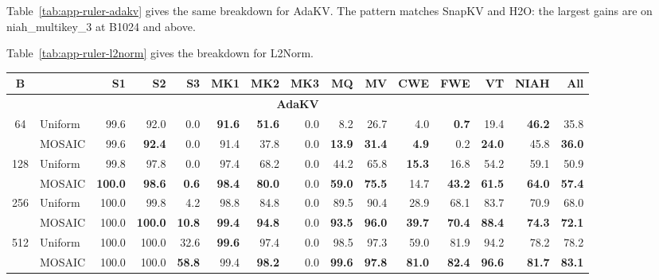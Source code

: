 Table~\ref{tab:app-ruler-adakv} gives the same breakdown for AdaKV. The pattern matches SnapKV and H2O: the largest gains are on niah\_multikey\_3 at B1024 and above.


Table~\ref{tab:app-ruler-l2norm} gives the breakdown for L2Norm.

\begin{table}[tp]
  \centering
  \scriptsize
  \setlength{\tabcolsep}{4pt}
  \renewcommand{\arraystretch}{0.92}
  \begin{tabular}{@{} c l rrrrrrrrrrrrr @{}}
    \toprule
    \textbf{B} & & \textbf{S1} & \textbf{S2} & \textbf{S3} & \textbf{MK1} & \textbf{MK2} & \textbf{MK3} & \textbf{MQ} & \textbf{MV} & \textbf{CWE} & \textbf{FWE} & \textbf{VT} & \textbf{NIAH} & \textbf{All} \\
    \midrule
    \multicolumn{15}{c}{\textbf{AdaKV}} \\
    \midrule
    \multirow{2}{*}{64} & Uniform & 99.6 & 92.0 & 0.0 & \textbf{91.6} & \textbf{51.6} & 0.0 & 8.2 & 26.7 & 4.0 & \textbf{0.7} & 19.4 & \textbf{46.2} & 35.8 \\
     & MOSAIC & 99.6 & \textbf{92.4} & 0.0 & 91.4 & 37.8 & 0.0 & \textbf{13.9} & \textbf{31.4} & \textbf{4.9} & 0.2 & \textbf{24.0} & 45.8 & \textbf{36.0} \\
    \cmidrule(l){1-15}
    \multirow{2}{*}{128} & Uniform & 99.8 & 97.8 & 0.0 & 97.4 & 68.2 & 0.0 & 44.2 & 65.8 & \textbf{15.3} & 16.8 & 54.2 & 59.1 & 50.9 \\
     & MOSAIC & \textbf{100.0} & \textbf{98.6} & \textbf{0.6} & \textbf{98.4} & \textbf{80.0} & 0.0 & \textbf{59.0} & \textbf{75.5} & 14.7 & \textbf{43.2} & \textbf{61.5} & \textbf{64.0} & \textbf{57.4} \\
    \cmidrule(l){1-15}
    \multirow{2}{*}{256} & Uniform & 100.0 & 99.8 & 4.2 & 98.8 & 84.8 & 0.0 & 89.5 & 90.4 & 28.9 & 68.1 & 83.7 & 70.9 & 68.0 \\
     & MOSAIC & 100.0 & \textbf{100.0} & \textbf{10.8} & \textbf{99.4} & \textbf{94.8} & 0.0 & \textbf{93.5} & \textbf{96.0} & \textbf{39.7} & \textbf{70.4} & \textbf{88.4} & \textbf{74.3} & \textbf{72.1} \\
    \cmidrule(l){1-15}
    \multirow{2}{*}{512} & Uniform & 100.0 & 100.0 & 32.6 & \textbf{99.6} & 97.4 & 0.0 & 98.5 & 97.3 & 59.0 & 81.9 & 94.2 & 78.2 & 78.2 \\
     & MOSAIC & 100.0 & 100.0 & \textbf{58.8} & 99.4 & \textbf{98.2} & 0.0 & \textbf{99.6} & \textbf{97.8} & \textbf{81.0} & \textbf{82.4} & \textbf{96.6} & \textbf{81.7} & \textbf{83.1} \\

\end{tabular}
\end{table}
